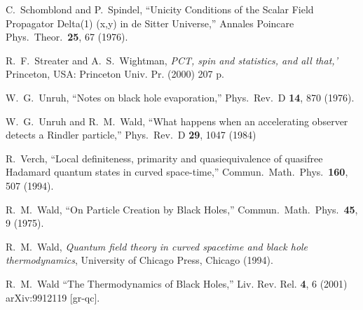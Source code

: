 \documentclass[12pt]{article}
\theoremstyle{plain}
\theoremstyle{definition}
\begin{document}
\begin{thebibliography}{99}
C.~Schomblond and P.~Spindel,
  ``Unicity Conditions of the Scalar Field Propagator Delta(1) (x,y) in de Sitter Universe,''
  Annales Poincare Phys.\ Theor.\  {\bf 25}, 67 (1976).

 R.~F.~Streater and A.~S.~Wightman,
  {\em PCT, spin and statistics, and all that,'}
  Princeton, USA: Princeton Univ. Pr. (2000) 207 p.

  W.~G.~Unruh,
  ``Notes on black hole evaporation,''
  Phys.\ Rev.\ D {\bf 14}, 870 (1976).

 W.~G.~Unruh and R.~M.~Wald,
  ``What happens when an accelerating observer detects a Rindler particle,''
  Phys.\ Rev.\ D {\bf 29}, 1047 (1984)

 R.~Verch,
  ``Local definiteness, primarity and quasiequivalence of quasifree Hadamard quantum states in curved space-time,''
  Commun.\ Math.\ Phys.\  {\bf 160}, 507 (1994).
  
R.~M.~Wald,
  ``On Particle Creation by Black Holes,''
  Commun.\ Math.\ Phys.\  {\bf 45}, 9 (1975).
  
 R.~M.~Wald,
 {\em Quantum field theory in curved spacetime and black hole thermodynamics},
 University of Chicago Press, Chicago (1994). 

R.~M.~Wald
``The Thermodynamics of Black Holes,''
Liv. Rev. Rel. {\bf 4}, 6 (2001)
arXiv:9912119 [gr-qc].

\end{thebibliography}
\end{document}
